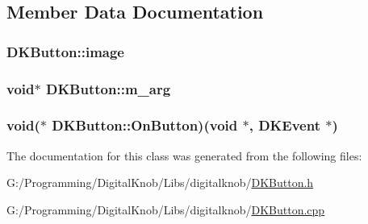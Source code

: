 \subsection{Member Data Documentation}
\hypertarget{class_d_k_button_ad6720b491cb15049c94653dc225ae2ec}{
\subsubsection[{image}]{ D\-K\-Button\-::image}}\label{class_d_k_button_ad6720b491cb15049c94653dc225ae2ec}
\hypertarget{class_d_k_button_a00f0135dcaa5a1244cd7032a7b6996d7}{
\subsubsection[{m\-\_\-arg}]{\setlength{\rightskip}{0pt plus 5cm}void$\ast$ D\-K\-Button\-::m\-\_\-arg}}\label{class_d_k_button_a00f0135dcaa5a1244cd7032a7b6996d7}
\hypertarget{class_d_k_button_ab66f2da0f50ca9691e36a88c17ac942a}{
\subsubsection[{On\-Button}]{\setlength{\rightskip}{0pt plus 5cm}void($\ast$ D\-K\-Button\-::\-On\-Button)(void $\ast$, {\bf D\-K\-Event} $\ast$)}}\label{class_d_k_button_ab66f2da0f50ca9691e36a88c17ac942a}


The documentation for this class was generated from the following files\-:\begin{DoxyCompactItemize}
\item 
G\-:/\-Programming/\-Digital\-Knob/\-Libs/digitalknob/\hyperlink{_d_k_button_8h}{D\-K\-Button.\-h}\item 
G\-:/\-Programming/\-Digital\-Knob/\-Libs/digitalknob/\hyperlink{_d_k_button_8cpp}{D\-K\-Button.\-cpp}\end{DoxyCompactItemize}
